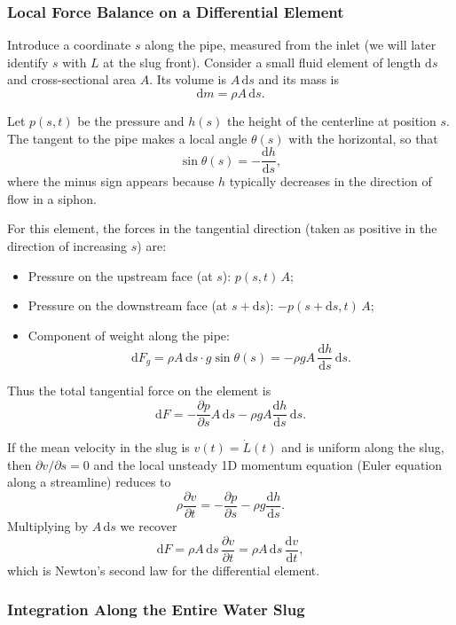 \documentclass[11pt]{article}
\begin{document}
\subsubsection*{Local Force Balance on a Differential Element}

Introduce a coordinate $s$ along the pipe, measured from the inlet (we will
later identify $s$ with $L$ at the slug front). Consider a small fluid element
of length $\mathrm{d}s$ and cross-sectional area $A$. Its volume is
$A\,\mathrm{d}s$ and its mass is
\[
\mathrm{d}m = \rho A\,\mathrm{d}s.
\]

Let $p(s,t)$ be the pressure and $h(s)$ the height of the centerline at position
$s$. The tangent to the pipe makes a local angle $\theta(s)$ with the horizontal,
so that
\[
\sin\theta(s) = -\frac{\mathrm{d}h}{\mathrm{d}s},
\]
where the minus sign appears because $h$ typically decreases in the direction
of flow in a siphon.

For this element, the forces in the tangential direction (taken as positive in
the direction of increasing $s$) are:
\begin{itemize}
  \item Pressure on the upstream face (at $s$): $p(s,t)\,A$;
  \item Pressure on the downstream face (at $s + \mathrm{d}s$):
        $-p(s+\mathrm{d}s,t)\,A$;
  \item Component of weight along the pipe:
        \[
        \mathrm{d}F_g = \rho A\,\mathrm{d}s \cdot g \sin\theta(s)
        = -\rho g A\,\frac{\mathrm{d}h}{\mathrm{d}s}\,\mathrm{d}s.
        \]
\end{itemize}
Thus the total tangential force on the element is
\[
\mathrm{d}F
= -\frac{\partial p}{\partial s} A\,\mathrm{d}s
  - \rho g A \frac{\mathrm{d}h}{\mathrm{d}s}\,\mathrm{d}s.
\]

If the mean velocity in the slug is $v(t) = \dot L(t)$ and is uniform along the
slug, then $\partial v/\partial s = 0$ and the local unsteady 1D momentum
equation (Euler equation along a streamline) reduces to
\[
\rho \frac{\partial v}{\partial t}
  = -\frac{\partial p}{\partial s} - \rho g \frac{\mathrm{d}h}{\mathrm{d}s}.
\]
Multiplying by $A\,\mathrm{d}s$ we recover
\[
\mathrm{d}F = \rho A\,\mathrm{d}s \,\frac{\partial v}{\partial t}
           = \rho A\,\mathrm{d}s \,\frac{\mathrm{d}v}{\mathrm{d}t},
\]
which is Newton's second law for the differential element.

\subsubsection*{Integration Along the Entire Water Slug}
\end{document}
